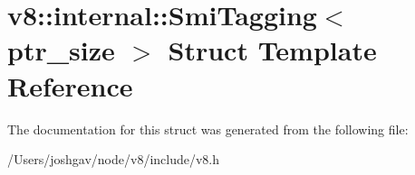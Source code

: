 \hypertarget{structv8_1_1internal_1_1_smi_tagging}{}\section{v8\+:\+:internal\+:\+:Smi\+Tagging$<$ ptr\+\_\+size $>$ Struct Template Reference}
\label{structv8_1_1internal_1_1_smi_tagging}


The documentation for this struct was generated from the following file\+:\begin{DoxyCompactItemize}
\item 
/\+Users/joshgav/node/v8/include/v8.\+h\end{DoxyCompactItemize}
